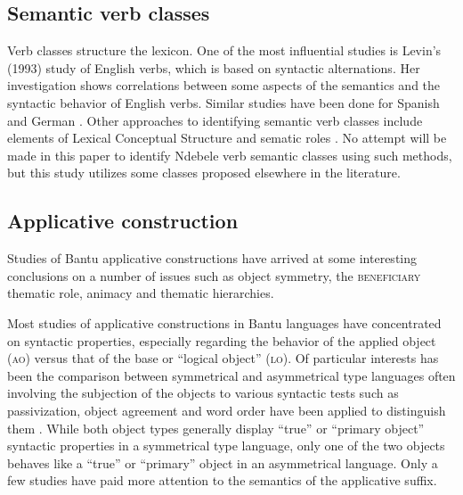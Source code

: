 \documentclass[output=paper]{langsci/langscibook}
\begin{document}
\subsection{Semantic verb classes}\label{sec:sibanda:2.2}

Verb classes structure the lexicon. One of the most influential studies is Levin’s (1993) study of English verbs, which is based on syntactic alternations. Her investigation shows correlations between some aspects of the semantics and the syntactic behavior of English verbs. Similar studies have been done for Spanish \citep{VazquezEtAl2000} and German \citep{Schumacher1986,SchulteimWaldeBrew2002}. Other approaches to identifying semantic verb classes include elements of Lexical Conceptual Structure \citep{Gruber1965,Jackendoff1983,Jackendoff1990} and sematic roles \citep{Chafe1970,Cook1979,Longacre1976,FoleyVanValin1984,VanValin1993}. No attempt will be made in this paper to identify Ndebele verb semantic classes using such methods, but this study utilizes some classes proposed elsewhere in the literature.

\subsection{Applicative construction} \label{sec:sibanda:2.3}

Studies of Bantu applicative constructions have arrived at some interesting conclusions on a number of issues such as object symmetry, the \textsc{beneficiary} thematic role, animacy and thematic hierarchies. 

Most studies of applicative constructions in Bantu languages have concentrated on syntactic properties, especially regarding the behavior of the applied object (\textsc{ao}) versus that of the base or “logical object” (\textsc{lo}). Of particular interests has been the comparison between symmetrical and asymmetrical type languages often involving the subjection of the objects to various syntactic tests such as passivization, object agreement and word order have been applied to distinguish them \citep{BresnanMoshi1990,NgonyaniGithinji2006,Pylkkanen2000,Machobane1989,AlsinaMchombo1993,Baker1988,Harford1993,Ngonyani1996}. While both object types generally display “true” or “primary object” syntactic properties in a symmetrical type language, only one of the two objects behaves like a “true” or “primary” object in an asymmetrical language. Only a few studies have paid more attention to the semantics of the applicative suffix. 
\end{document}
